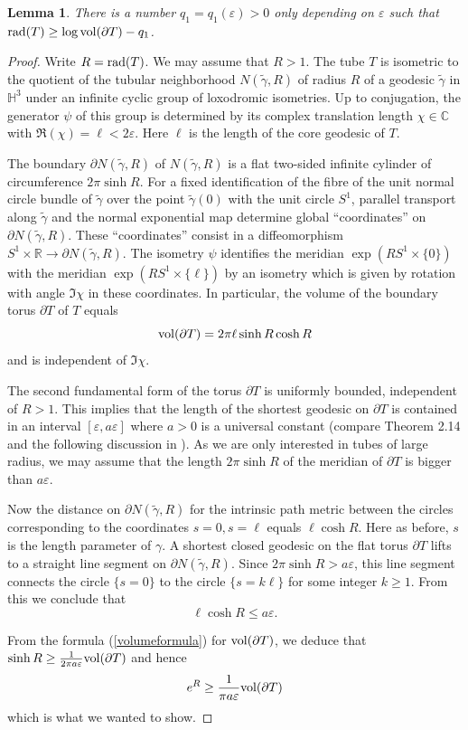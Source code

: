 \documentclass[11pt]{amsart}
\theoremstyle{plain}
\theoremstyle{plain}
\newtheorem{lemma}[theorem]{Lemma}
\theoremstyle{definition}
\renewcommand{\epsilon}{\varepsilon}
\begin{document}
\begin{lemma}\label{radiusbound}
There is a number $q_1=q_1(\epsilon)>0$ only depending on $\epsilon$ such that
${\rm rad}(T)\geq \log {\rm vol}(\partial T)-q_1$. 
\end{lemma}
\begin{proof} 
Write $R={\rm rad}(T)$. We may assume that $R>1$.
The tube $T$ is isometric to the quotient of the tubular
neighborhood $N(\tilde \gamma,R)$ of radius $R$ 
of a geodesic $\tilde \gamma$ in $\mathbb{H}^3$ under
an infinite cyclic group of loxodromic isometries. Up to conjugation, the generator
$\psi$ of this group 
is determined by its complex translation length $\chi\in \mathbb{C}$
with $\Re(\chi)=\ell<2\epsilon$. Here $\ell$ is the length of the core geodesic of $T$.


The boundary $\partial N(\tilde \gamma, R)$ of $N(\tilde \gamma,R)$ 
is a flat two-sided infinite cylinder of circumference $2\pi \sinh R$. 
For a fixed identification of the fibre
of the unit normal circle bundle of $\tilde \gamma$ over the point
$\tilde \gamma(0)$ with the unit circle $S^1$, parallel transport along $\tilde\gamma$ and the 
normal exponential map determine global ``coordinates'' on 
$\partial N(\tilde \gamma,R)$. These ``coordinates'' consist in a 
diffeomorphism 
$S^1\times \mathbb{R}\to \partial N(\tilde \gamma,R)$. The isometry $\psi$   
identifies the meridian
$\exp(R S^1\times \{0\})$ 
with the meridian $\exp(R S^1\times \{\ell\})$   
by an isometry
which is given by rotation with angle $\Im \chi$
in these coordinates. In particular, 
the volume of the boundary torus $\partial T$ of $T$ 
equals 
\begin{equation}\label{volumeformula}
{\rm vol}(\partial T)=2\pi\ell \sinh R\cosh R
\end{equation} 
and is independent of 
$\Im \chi$. 

The second fundamental form of the torus 
$\partial T$ is uniformly bounded, independent of $R>1$. 
This implies  that 
the length of
the shortest geodesic on $\partial T$ is contained
in an interval $[\epsilon,a\epsilon]$ where $a>0$ is a
universal constant (compare Theorem 2.14  and the 
following discussion in \cite{BCD93}).
As we are only interested in tubes of large radius, 
we may assume that the length
$2\pi \sinh R$ of the meridian of 
$\partial T$ is bigger than $a\epsilon$. 

Now the distance on $\partial N(\tilde \gamma,R)$ 
for the intrinsic path metric between the 
circles corresponding to the coordinates $s=0,s=\ell$ 
equals $\ell\cosh R$. Here as before, $s$ is the length parameter
of $\gamma$. A shortest closed geodesic
on the flat torus 
$\partial T$ lifts to a straight line segment on
$\partial N(\tilde \gamma,R)$. Since $2\pi\sinh R>a\epsilon$, 
this line segment connects the circle $\{s=0\}$ to the circle
$\{s=k \ell\}$ for some integer $k\geq 1$. From this we conclude that
\[\ell\cosh R\leq a\epsilon.\]

From the formula (\ref{volumeformula})
for ${\rm vol}(\partial T)$, we deduce that
$\sinh R\geq \frac{1}{2\pi a\epsilon}{\rm vol}(\partial T)$ and hence 
\[e^R\geq \frac{1}{\pi a\epsilon}{\rm vol}(\partial T)\]
which is what we wanted to show.
\end{proof}
\end{document}

